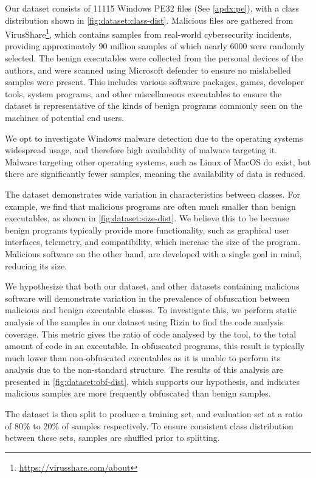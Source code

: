 \documentclass[main.tex]{subfiles}
\begin{document}
Our dataset consists of 11115 Windows PE32 files (See \cref{apdx:pe}), with a class distribution shown in \cref{fig:dataset:class-dist}. Malicious files are gathered from VirusShare\footnote{\url{https://virusshare.com/about}}, which contains samples from real-world cybersecurity incidents, providing approximately 90 million samples of which nearly 6000 were randomly selected. The benign executables were collected from the personal devices of the authors, and were scanned using Microsoft defender to ensure no mislabelled samples were present. This includes various software packages, games, developer tools, system programs, and other miscellaneous executables to ensure the dataset is representative of the kinds of benign programs commonly seen on the machines of potential end users.

We opt to investigate Windows malware detection due to the operating systems widespread usage, and therefore high availability of malware targeting it. Malware targeting other operating systems, such as Linux of MacOS do exist, but there are significantly fewer samples, meaning the availability of data is reduced.

The dataset demonstrates wide variation in characteristics between classes. For example, we find that malicious programs are often much smaller than benign executables, as shown in \cref{fig:dataset:size-dist}. We believe this to be because benign programs typically provide more functionality, such as graphical user interfaces, telemetry, and compatibility, which increase the size of the program. Malicious software on the other hand, are developed with a single goal in mind, reducing its size.

We hypothesize that both our dataset, and other datasets containing malicious software will demonstrate variation in the prevalence of obfuscation between malicious and benign executable classes. To investigate this, we perform static analysis of the samples in our dataset using Rizin \citep{rizinorganizationRizin2025} to find the code analysis coverage. This metric gives the ratio of code analysed by the tool, to the total amount of code in an executable. In obfuscated programs, this result is typically much lower than non-obfuscated executables as it is unable to perform its analysis due to the non-standard structure. The results of this analysis are presented in \cref{fig:dataset:obf-dist}, which supports our hypothesis, and indicates malicious samples are more frequently obfuscated than benign samples.  

The dataset is then split to produce a training set, and evaluation set at a ratio of 80\% to 20\% of samples respectively. To ensure consistent class distribution between these sets, samples are shuffled prior to splitting. 
\end{document}
